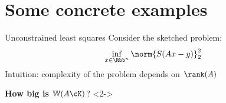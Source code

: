 \documentclass[10pt]{beamer}
\begin{document}
\section{Some concrete examples}

\begin{frame}{Unconstrained least squares}
    Consider the sketched problem:
    \begin{align*}
        \inf_{x \in \Rbb^n} \norm{S(Ax - y)}_2^2
    \end{align*}
    Intuition: complexity of the problem depends on $\rank(A)$ \linebreak

    \begin{center}
        {\color{cred} \textbf{How big is} $\mathbb{W}(A \cK)$?}
        <2->
    \end{center}
\end{frame}
\end{document}
